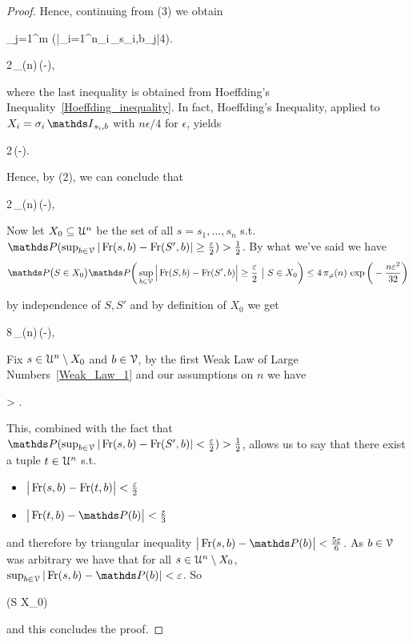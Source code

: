 \documentclass[scombinatorics.tex]{subfiles}
\begin{document}
\begin{proof}
  Hence, continuing from (3) we obtain

  \ceq{}
  {\le}
  {\sum_{j=1}^m \Pr\bigg(\Big|\sum_{i=1}^n\sigma_i\,\Indicator_{s_i,b_j}\Big|\ge{}4\bigg).}

  \ceq{}
  {\le}
  {2\,\pi_\phi(n)\,\exp\bigg(-\bigg),}

  where the last inequality is obtained from Hoeffding's Inequality~\ref{Hoeffding_inequality}.
  In fact, Hoeffding's Inequality, applied to $X_i=\sigma_i\,\Indicator_{s_i,b}$ with $n\epsilon/4$ for $\epsilon$, yields

  {\le}
  {2\,\exp\Big(-\Big).}

  Hence, by (2), we can conclude that
  
  {\le}
  {2\,\pi_\phi(n)\,\exp\bigg(-\bigg),}
  \smallskip
  
  
  Now let $X_0\subseteq \EuScript U^n$ be the set of all $s = s_1,\dots,s_n$ s.t. $\Pr(\sup_{b\in\V}|\Fr(s,b) - \Fr(S',b)|\ge\frac{\epsilon}2) > \frac{1}{2}$.
  By what we've said we have
 $$\Pr\big(S \in X_0\big)\Pr\bigg(\sup_{b\in\V}\Big|\Fr(S,b) - \Fr(S',b)\Big| \ge\frac{\epsilon}2 \ \big|\ S \in X_0 \bigg)
  \le
  4\,\pi_\phi(n)\,\exp\bigg(-\frac{n\epsilon^2}{32}\bigg)$$
 
  by independence of $S,S'$ and by definition of $X_0$ we get 
  
  {\le}
  {8\,\pi_\phi(n)\,\exp\bigg(-\bigg),}
  
  Fix $s \in \EuScript U^n \setminus X_0$ and $b \in \EuScript V$, by the first Weak Law of Large Numbers~\ref{Weak_Law_1} and our assumptions on $n$ we have
  
  {>}
  {.}
  
  This, combined with the fact that $\Pr(\sup_{b\in\V}|\Fr(s,b) - \Fr(S',b)|<\frac{\epsilon}2) > \frac{1}{2}$, allows us to say that there exist a tuple $t \in \EuScript U^n$ s.t.
  \begin{itemize}
      \item $\big|\mathop{\rm Fr}(s,b)-\mathop{\rm Fr}(t,b)\big| < \frac{\varepsilon}{2}$
      \item $\big|\Fr(t,b) - \Pr(b)\big|<\frac{\epsilon}{3}$
  \end{itemize}
  
  and therefore by triangular inequality $\big|\Fr(s,b) - \Pr(b)\big|< \frac{5\epsilon}6$. As $b \in \EuScript V$ was arbitrary we have that for all $s \in \EuScript U^n\setminus X_0$, $\sup_{b\in\V}|\Fr(s,b) - \Pr(b)|< \epsilon$. So
  
  {\le}
  {\Pr\big(S \in X_0\big)}
  
  and this concludes the proof.
\end{proof}
\end{document}
